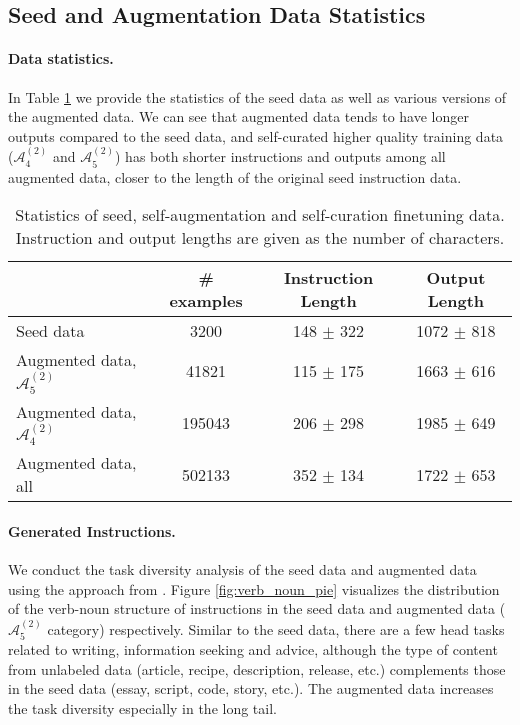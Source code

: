 \subsection{Seed and Augmentation Data Statistics} 

\paragraph{Data statistics.} In Table \ref{tab:train_data_stats} we provide the  statistics of the seed data as well as various versions of the augmented data. We can see that augmented data tends to have longer outputs compared to the seed data, and self-curated higher quality training data ($\mathcal{A}_4^{(2)}$ and $\mathcal{A}_5^{(2)}$) has both shorter instructions and outputs among all augmented data, closer to the length of the original seed instruction data.

\begin{table}[t]
    \caption{Statistics of seed, self-augmentation and self-curation finetuning data. Instruction and output lengths are given as the number of characters.
  \label{tab:train_data_stats}
    }
  \centering
  \small
  \begin{tabular}{lccc}
    \toprule
        & \textbf{\# examples} & \textbf{Instruction Length}  &  \textbf{Output Length}   \\
    \midrule

  Seed data & 3200  &  148 $\pm$ 322 & 1072  $\pm$ 818   \\ 
    \vspace{1mm}
  Augmented data, $\mathcal{A}_{5}^{(2)}$  & 41821 & 115  $\pm$ 175 & 1663  $\pm$ 616  \\
    \vspace{1mm}
   Augmented data, 
  $\mathcal{A}_{4}^{(2)}$  & 195043 & 206  $\pm$ 298 & 1985  $\pm$ 649  \\ 
  Augmented data, all  & 502133  & 352  $\pm$ 134 & 1722  $\pm$ 653  \\  
    \bottomrule
  \end{tabular}
  \vspace{1mm}
\end{table}
\paragraph{Generated Instructions.}  We conduct the task diversity analysis of the seed data and augmented data using the approach from \cite{wang2022self}. Figure \ref{fig:verb_noun_pie} visualizes the distribution of the verb-noun structure of instructions in the seed data and augmented data ($\mathcal{A}_5^{(2)}$ category) respectively. Similar to the seed data, there are a few head tasks related to writing, information seeking and advice, although the type of content from unlabeled data (article, recipe, description, release, etc.) complements those in the seed data (essay, script, code, story, etc.). The augmented data increases the task diversity especially in the long tail. 


